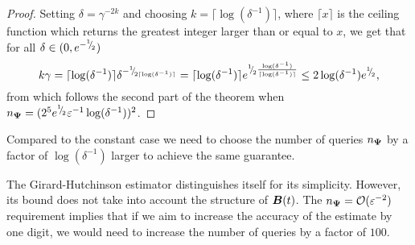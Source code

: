 \documentclass[12pt]{article}
\begin{document}
\begin{proof}
    Setting $\delta = \gamma^{-2 k}$ and choosing $k = \lceil \log(\delta^{-1}) \rceil$, where $\lceil x \rceil$ is the ceiling function which returns the greatest integer larger than or equal to $x$, we get that for all $\delta \in (0, e^{-{}^{1}{\mskip -5mu/\mskip -3mu}_{2}})$
    \begin{equation}
        k \gamma = \lceil \log(\delta^{-1}) \rceil \delta^{-{}^{1}{\mskip -5mu/\mskip -3mu}_{2\lceil \log(\delta^{-1}) \rceil}}
        = \lceil \log(\delta^{-1}) \rceil e^{{}^{1}{\mskip -5mu/\mskip -3mu}_{2}\frac{\log(\delta^{-1})}{\lceil \log(\delta^{-1}) \rceil}}
        \leq 2 \log(\delta^{-1}) e^{{}^{1}{\mskip -5mu/\mskip -3mu}_{2}},
    \end{equation}
    from which follows the second part of the theorem when $n_{\boldsymbol{\Psi}} = (2^5 e^{{}^{1}{\mskip -5mu/\mskip -3mu}_{2}} \varepsilon^{-1} \log(\delta^{-1}))^2$.
\end{proof}


Compared to the constant case \cite[lemma 2.1]{meyer-2021-hutch-optimal} we need to choose the number of queries $n_{\boldsymbol{\Psi}}$ by a factor of $\log(\delta^{-1})$ larger to achieve the same guarantee.

The Girard-Hutchinson estimator distinguishes itself for its simplicity. However, its bound does not take into account the structure of $\boldsymbol{B}(t)$. The $n_{\boldsymbol{\Psi}} = \mathcal{O}(\varepsilon^{-2})$ requirement implies that if we aim to increase the accuracy of the estimate by one digit, we would need to increase the number of queries by a factor of $100$. 
\end{document}
